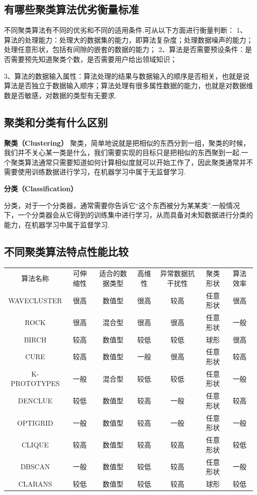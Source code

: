\subsection{有哪些聚类算法优劣衡量标准}\label{ux6709ux54eaux4e9bux805aux7c7bux7b97ux6cd5ux4f18ux52a3ux8861ux91cfux6807ux51c6}

不同聚类算法有不同的优劣和不同的适用条件.可从以下方面进行衡量判断：
1、算法的处理能力：处理大的数据集的能力，即算法复杂度；处理数据噪声的能力；处理任意形状，包括有间隙的嵌套的数据的能力；
2、算法是否需要预设条件：是否需要预先知道聚类个数，是否需要用户给出领域知识；

​
3、算法的数据输入属性：算法处理的结果与数据输入的顺序是否相关，也就是说算法是否独立于数据输入顺序；算法处理有很多属性数据的能力，也就是对数据维数是否敏感，对数据的类型有无要求.

\subsection{聚类和分类有什么区别}\label{ux805aux7c7bux548cux5206ux7c7bux6709ux4ec0ux4e48ux533aux522b}

\textbf{聚类（Clustering） }
聚类，简单地说就是把相似的东西分到一组，聚类的时候，我们并不关心某一类是什么，我们需要实现的目标只是把相似的东西聚到一起.一个聚类算法通常只需要知道如何计算相似度就可以开始工作了，因此聚类通常并不需要使用训练数据进行学习，在机器学习中属于无监督学习.

\textbf{分类（Classification） }

​
分类，对于一个分类器，通常需要你告诉它``这个东西被分为某某类''.一般情况下，一个分类器会从它得到的训练集中进行学习，从而具备对未知数据进行分类的能力，在机器学习中属于监督学习.

\subsection{不同聚类算法特点性能比较}\label{ux4e0dux540cux805aux7c7bux7b97ux6cd5ux7279ux70b9ux6027ux80fdux6bd4ux8f83}

\begin{longtable}[]{ ccccccc }
算法名称 & 可伸缩性 & 适合的数据类型 & 高维性 & 异常数据抗干扰性 &
聚类形状 & 算法效率\tabularnewline
WAVECLUSTER & 很高 & 数值型 & 很高 & 较高 & 任意形状 &
很高\tabularnewline
ROCK & 很高 & 混合型 & 很高 & 很高 & 任意形状 & 一般\tabularnewline
BIRCH & 较高 & 数值型 & 较低 & 较低 & 球形 & 很高\tabularnewline
CURE & 较高 & 数值型 & 一般 & 很高 & 任意形状 & 较高\tabularnewline
K-PROTOTYPES & 一般 & 混合型 & 较低 & 较低 & 任意形状 &
一般\tabularnewline
DENCLUE & 较低 & 数值型 & 较高 & 一般 & 任意形状 & 较高\tabularnewline
OPTIGRID & 一般 & 数值型 & 较高 & 一般 & 任意形状 & 一般\tabularnewline
CLIQUE & 较高 & 数值型 & 较高 & 较高 & 任意形状 & 较低\tabularnewline
DBSCAN & 一般 & 数值型 & 较低 & 较高 & 任意形状 & 一般\tabularnewline
CLARANS & 较低 & 数值型 & 较低 & 较高 & 球形 & 较低\tabularnewline
\end{longtable}

